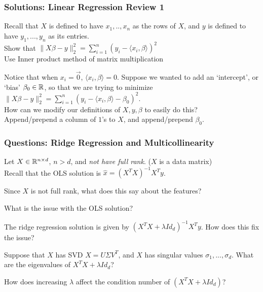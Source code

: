 \documentclass{beamer}
\renewenvironment{enumerate}%
{\begin{list}{\arabic{enumi}.}%
      {\setlength{\leftmargin}{2.5em}%
       \setlength{\itemsep}{-\parsep}%
       \setlength{\topsep}{-\parskip}%
       \usecounter{enumi}}%
 }{\end{list}}
\begin{document}
\begin{frame}
\frametitle{Solutions: Linear Regression Review 1}
\begin{solution}
\begin{enumerate}
\item Recall that $X$ is defined to have $x_1,..,x_n$ as the rows of $X$, and $y$ is defined to have $y_1,...,y_n$ as its entries. \\
Show that $\|X\beta - y\|_2^2 = \sum_{i=1}^n (y_i - \langle x_i,\beta \rangle)^2$ \\
Use Inner product method of matrix multiplication
\item Notice that when $x_i = \vec{0}$, $\langle x_i, \beta \rangle = 0$. Suppose we wanted to add an `intercept', or `bias' $\beta_0\in \mathbb{R}$,
so that we are trying to minimize $\|X\beta - y\|_2^2 = \sum_{i=1}^n (y_i - \langle x_i,\beta \rangle-\beta_0)^2$.\\
How can we modify our definitions of $X,y,\beta$ to easily do this?\\
Append/prepend a column of $1$'s to $X$, and append/prepend $\beta_0$.
\end{enumerate}
\end{solution}
\end{frame}

\begin{frame}
\frametitle{Questions: Ridge Regression and Multicollinearity}
Let $X \in \mathbb{R}^{n\times d}$, $n>d$, and \textit{not have full rank}. ($X$ is a data matrix) \\
Recall that the OLS solution is $\hat{x} = (X^TX)^{-1}X^Ty$.
\begin{enumerate}
\item Since $X$ is not full rank, what does this say about the features?
\item What is the issue with the OLS solution?
\item The ridge regression solution is given by $(X^TX+\lambda Id_d)^{-1}X^Ty$. How does this fix the issue?
\item Suppose that $X$ has SVD $X=U\Sigma V^T$, and $X$ has singular values $\sigma_1,...,\sigma_d$. What are the eigenvalues of 
$X^TX + \lambda Id_d$?
\item How does increasing $\lambda$ affect the condition number of $(X^TX + \lambda Id_d)$?
\end{enumerate}
\end{frame}
\end{document}
